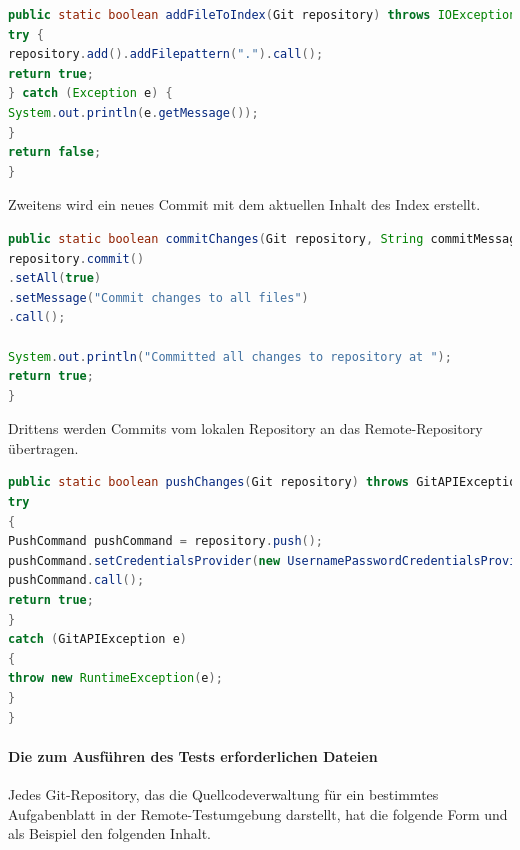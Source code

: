\documentclass[apaper4,12p]{scrartcl}
\begin{document}
\begin{lstlisting}[language=JAVA,caption=Add File To Index ]
public static boolean addFileToIndex(Git repository) throws IOException, GitAPIException {
try {
repository.add().addFilepattern(".").call();
return true;
} catch (Exception e) {
System.out.println(e.getMessage());
}
return false;
}
\end{lstlisting} 
Zweitens wird ein neues Commit mit dem aktuellen Inhalt des Index erstellt.
\begin{lstlisting}[language=JAVA,caption=commit Changes ]
	public static boolean commitChanges(Git repository, String commitMessage) throws GitAPIException, IOException {
repository.commit()
.setAll(true)
.setMessage("Commit changes to all files")
.call();

System.out.println("Committed all changes to repository at ");
return true;
}
\end{lstlisting} 
Drittens werden Commits vom lokalen Repository an das Remote-Repository übertragen.
\begin{lstlisting}[language=JAVA,caption=Push Changes ]
public static boolean pushChanges(Git repository) throws GitAPIException, URISyntaxException, IOException {
try
{
PushCommand pushCommand = repository.push();
pushCommand.setCredentialsProvider(new UsernamePasswordCredentialsProvider("swissi", "Mh123456"));
pushCommand.call();
return true;
}
catch (GitAPIException e)
{
throw new RuntimeException(e);
}
}
\end{lstlisting} 

 
\paragraph{Die zum Ausführen des Tests erforderlichen Dateien}
Jedes Git-Repository, das die Quellcodeverwaltung für ein bestimmtes Aufgabenblatt in der Remote-Testumgebung darstellt, hat die folgende Form und als Beispiel den folgenden Inhalt.
\newline
{}
\end{document}
